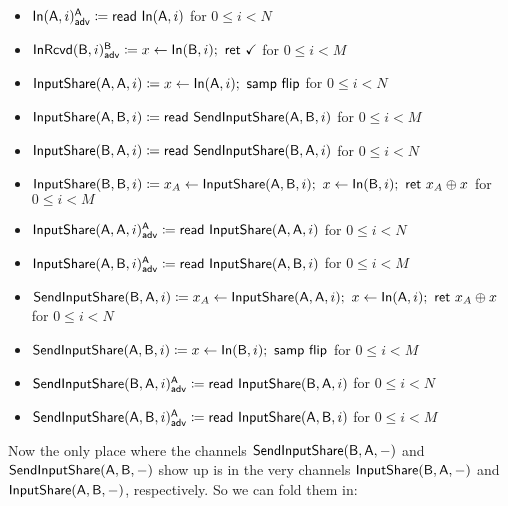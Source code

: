 \begin{itemize}
\item {\color{blue} $\LeakIn(\A,i)^\A_\adv \coloneqq \read{\In(\A,i)}$ for $0 \leq i < N$}
\item {\color{blue} $\LeakInRcvd(\B,i)^\B_\adv \coloneqq x \leftarrow \In(\B,i); \ \ret{\checkmark}$ for $0 \leq i < M$}\smallskip
\item $\InputShare(\A,\A,i) \coloneqq x \leftarrow \In(\A,i); \ \samp{\flip}$ for $0 \leq i < N$
\item $\InputShare(\A,\B,i) \coloneqq \read{\SendInputShare(\A,\B,i)}$ for $0 \leq i < M$
\item $\InputShare(\B,\A,i) \coloneqq \read{\SendInputShare(\B,\A,i)}$ for $0 \leq i < N$
\item $\InputShare(\B,\B,i) \coloneqq x_A \leftarrow \InputShare(\A,\B,i); \ x \leftarrow \In(\B,i); \  \ret{x_A \oplus x}$ for $0 \leq i < M$\smallskip
\item {\color{blue} $\LeakInputShare(\A,\A,i)^\A_\adv \coloneqq \read{\InputShare(\A,\A,i)}$ for $0 \leq i < N$}
\item {\color{blue} $\LeakInputShare(\A,\B,i)^\A_\adv \coloneqq \read{\InputShare(\A,\B,i)}$ for $0 \leq i < M$}\smallskip
\item $\SendInputShare(\B,\A,i) \coloneqq x_A \leftarrow \InputShare(\A,\A,i); \ x \leftarrow \In(\A,i); \ \ret{x_A \oplus x}$ for $0 \leq i < N$
\item $\SendInputShare(\A,\B,i) \coloneqq x \leftarrow \In(\B,i); \ \samp{\flip}$ for $0 \leq i < M$\smallskip
\item {\color{blue} $\LeakSendInputShare(\B,\A,i)^\A_\adv \coloneqq \read{\InputShare(\B,\A,i)}$ for $0 \leq i < N$}
\item {\color{blue} $\LeakSendInputShare(\A,\B,i)^\A_\adv \coloneqq \read{\InputShare(\A,\B,i)}$ for $0 \leq i < M$}
\end{itemize}

\noindent Now the only place where the channels $\SendInputShare(\B,\A,-)$ and $\SendInputShare(\A,\B,-)$ show up is in the very channels $\InputShare(\B,\A,-)$ and $\InputShare(\A,\B,-)$, respectively. So we can fold them in:

